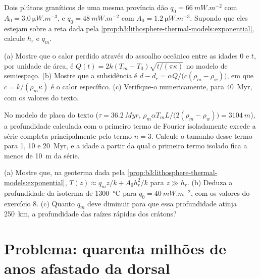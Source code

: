 \begin{exercise}[$\star\star$]\label{exo:b3:lithosphere-thermal-models:9}
Dois plútons graníticos de uma mesma província dão $q_0 = \qty{66}{mW.m^{-2}}$ com $A_0
= \qty{3.0}{\micro W.m^{-3}}$, e $q_0 = \qty{48}{mW.m^{-2}}$ com $A_0 =
\qty{1.2}{\micro W.m^{-3}}$. Supondo que eles estejam sobre a reta dada
pela \cref{prop:b3:lithosphere-thermal-models:exponential}, calcule $h_r$ e $q_m$.
\end{exercise}

\begin{exercise}[$\star\star\star$]\label{exo:b3:lithosphere-thermal-models:10}
(a) Mostre que o calor perdido através do assoalho oceânico entre as idades 0 e $t$, por
unidade de área, é $Q(t) = 2k(T_m - T_0)\sqrt{t/(\pi\kappa)}$ no modelo de
semiespaço. (b) Mostre que a subsidência é $d - d_r = \alpha Q/\bigl(c(\rho_m -
\rho_w)\bigr)$, em que $c = k/(\rho_m\kappa)$ é o calor específico. (c) Verifique-o
numericamente, para \qty{40}{Myr}, com os valores do texto.
\end{exercise}

\begin{exercise}[$\star\star\star$]\label{exo:b3:lithosphere-thermal-models:11}
No modelo de placa do texto ($\tau = \qty{36.2}{Myr}$, $\rho_m\alpha T_mL/
\bigl(2(\rho_m - \rho_w)\bigr) = \qty{3104}{m}$), a profundidade calculada com o
primeiro termo de Fourier isoladamente excede a série completa principalmente pelo termo $n = 3$.
Calcule o tamanho desse termo para 1, 10 e \qty{20}{Myr}, e a idade a partir da qual
o primeiro termo isolado fica a menos de \qty{10}{m} da série.
\end{exercise}

\begin{exercise}[$\star\star\star$]\label{exo:b3:lithosphere-thermal-models:12}
(a) Mostre que, na geoterma dada pela \cref{prop:b3:lithosphere-thermal-models:exponential},
$T(z) \approx q_mz/k + A_0h_r^2/k$ para $z \gg h_r$. (b) Deduza a profundidade da
isoterma de \qty{1300}{\celsius} para $q_0 = \qty{40}{mW.m^{-2}}$, com os valores
do exercício 8. (c) Quanto $q_m$ deve diminuir para que essa profundidade atinja
\qty{250}{km}, a profundidade das raízes rápidas dos crátons?
\end{exercise}

\section{Problema: quarenta milhões de anos afastado da dorsal}

